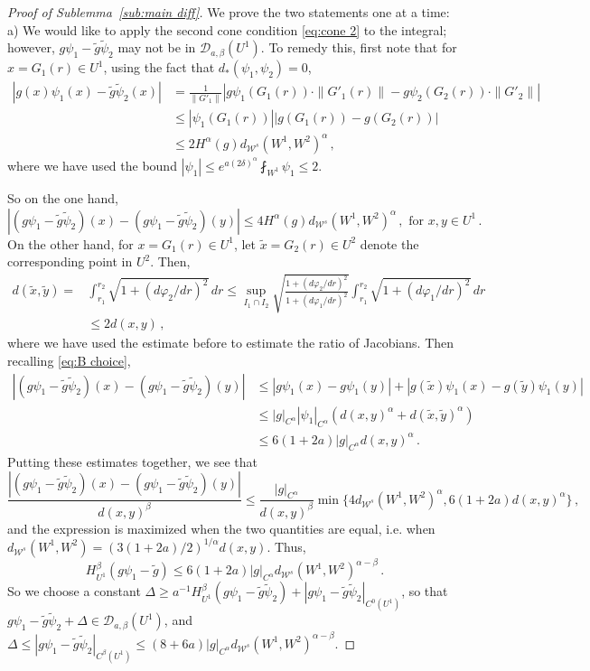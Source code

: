 \documentclass{amsart}
\numberwithin{equation}{section}
\newcommand\cD{{\mathcal D}}
\newcommand\cW{{\mathcal W}}
\newcommand\vf{\varphi}
\newcommand\tpsi{\tilde{\psi}}
\begin{document}
\begin{proof}[Proof of Sublemma~\ref{sub:main diff}]
We prove the two statements one at a time:\\
a) We would like to apply the second cone
condition \eqref{eq:cone 2} to the integral;  however, $g \psi_1 - \tilde g \tpsi_2$ may not be in $\cD_{a,\beta}(U^1)$.  To remedy this, first note that
for $x = G_1(r) \in U^1$, using the fact that $d_*(\psi_1, \psi_2)=0$,
\[
\begin{split}
|g(x)\psi_1(x) -\tilde g \tpsi_2(x)| & = \tfrac{1}{\| G'_1 \|} |g\psi_1(G_1(r)) \cdot \| G'_1(r) \| - g\psi_2(G_2(r)) \cdot \| G'_2 \| | \\
& \le |\psi_1(G_1(r))|  |g(G_1(r)) - g(G_2(r))| \\
& \le 2 H^\alpha(g) d_{\cW^s}(W^1, W^2)^\alpha \, ,
\end{split}
\]
where we have used  the bound $|\psi_1| \le e^{a(2\delta)^\alpha} \fint_{W^1} \psi_1 \le 2$.
 
So on the one hand,
\[
|(g \psi_1 - \tilde g \tpsi_2 )(x) - (g \psi_1 - \tilde g \tpsi_2)(y)| \le 4 H^\alpha(g) d_{\cW^s}(W^1, W^2)^\alpha \, , \mbox{ for } x, y \in U^1 \, .
\]
On the other hand, for $x = G_1(r) \in U^1$, let $\tilde x = G_2(r) \in U^2$ denote the corresponding point in $U^2$. Then,
\[
\begin{split}
d(\tilde x, \tilde y) =& \int_{r_1}^{r_2} \sqrt{1 + (d\vf_2/dr)^2} \, dr \le \sup_{I_1 \cap I_2} \sqrt{ \frac{1 + (d\vf_2/dr)^2}{1 + (d\vf_1/dr)^2} } 
\int_{r_1}^{r_2} \sqrt{1 + (d\vf_1/dr)^2 } \, dr\\
& \le 2 d(x,y) \, ,
\end{split}
\]
where we have used the estimate before \cite[eq. (5.9)]{DL22} to estimate the ratio of Jacobians.  Then
recalling \eqref{eq:B choice},
\[
\begin{split}
|(g\psi_1 - \tilde g \tpsi_2)(x) - (g \psi_1 - \tilde g \tpsi_2)(y)| 
& \le |g \psi_1(x) - g \psi_1(y)| + |g (\tilde x) \psi_1(x) - g (\tilde y) \psi_1(y)| \\
&  \le |g|_{C^\alpha} |\psi_1|_{C^\alpha} (d(x,y)^\alpha + d(\tilde x, \tilde y)^\alpha) \\
& \le 6 (1+2a) |g|_{C^\alpha} d(x,y)^\alpha \, .
\end{split}
\]
Putting these estimates together, we see that
\[
\frac{|(g\psi_1 - \tilde g \tpsi_2)(x) - (g\psi_1 - \tilde g \tpsi_2)(y)| }{d(x,y)^\beta} \le \frac{|g|_{C^\alpha}}{d(x,y)^\beta} \min \{ 4 d_{\cW^s}(W^1, W^2)^\alpha , 6(1+2a) d(x,y)^{\alpha} \} \, ,
\]
and the expression is maximized when the two quantities are equal, i.e. when $d_{\cW^s}(W^1, W^2) = (3(1+2a)/2)^{1/\alpha} d(x,y)$.  Thus,
\[
H^\beta_{U^1}(g\psi_1 - \tilde g) \le 6(1+2a) |g|_{C^\alpha} d_{\cW^s}(W^1, W^2)^{\alpha-\beta}  \, .
\]
So we choose a constant $\Delta \ge a^{-1} H^\beta_{U^1}(g\psi_1 - \tilde g \tpsi_2) + |g \psi_1 - \tilde g \tpsi_2|_{C^0(U^1)}$, so that
$g \psi_1 - \tilde g \tpsi_2+ \Delta \in \cD_{a,\beta}(U^1)$, and $\Delta \le |g \psi_1 - \tilde g \tpsi_2|_{C^\beta(U^1)} \le (8+6a) |g|_{C^\alpha} d_{\cW^s}(W^1, W^2)^{\alpha - \beta}$.


\end{proof}
\end{document}
